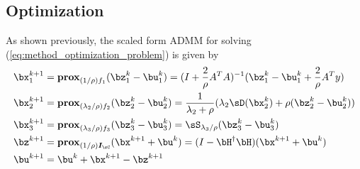 \documentclass[11pt]{article}
\renewcommand{\sI}{\boldsymbol{I}}
\newcommand{\prox}{\textbf{prox}}
\begin{document}
\subsection{Optimization}

As shown previously, the scaled form ADMM for solving (\ref{eq:method_optimization_problem}) is given by 
\begin{align*}
    \bx_1^{k+1}
        &= \prox_{(1/\rho)f_1}(\bz_1^k - \bu_1^k) 
        = (I + \frac{2}{\rho} A^TA)^{-1} ( \bz_1^k - \bu_1^k + \frac{2}{\rho}A^T y) \\
    \bx_2^{k+1}
        &= \prox_{(\lambda_2/\rho)f_2}(\bz_2^k - \bu_2^k) 
        = \frac{1}{\lambda_2+\rho} (\lambda_2 \sD(\bx_2^k) + \rho(\bz_2^k - \bu_2^k)) \\
    \bx_3^{k+1}
        &= \prox_{(\lambda_3/\rho)f_3} (\bz_3^k - \bu_3^k) 
        = \sS_{\lambda_3/\rho}(\bz_3^k - \bu_3^k) \\
    \bz^{k+1}
        &= \prox_{(1/\rho)\sI_{\sC}}(\bx^{k+1} + \bu^k)
        = (I - \bH^{\dagger}\bH)(\bx^{k+1}+\bu^k) \\
    \bu^{k+1}
        &= \bu^{k} + \bx^{k+1} - \bz^{k+1}
\end{align*}

 



\newpage
\printbibliography
\end{document}
